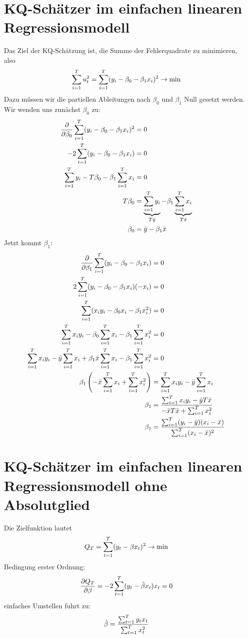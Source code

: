 \documentclass{article}
\begin{document}
	\section{KQ-Schätzer im einfachen linearen Regressionsmodell}
	Das Ziel der KQ-Schätzung ist, die Summe der Fehlerquadrate zu minimieren, also
	\begin{align}
		\sum_{i=1}^T u_t^2 = \sum_{i=1}^T (y_i-\beta_0 - \beta_1x_i)^2 \to\min \notag
	\end{align}
	Dazu müssen wir die partiellen Ableitungen nach $\beta_0$ und $\beta_1$ Null gesetzt werden. Wir wenden uns zunächst $\beta_0$ zu:
	\begin{align}
		\frac{\partial}{\partial\beta_0} \sum_{i=1}^T (y_i-\beta_0-\beta_1x_i)^2 &= 0 \notag \\
		-2\sum_{i=1}^T (y_i-\beta_0-\beta_1x_i) &= 0 \notag \\
		\sum_{i=1}^T y_i - T\beta_0 - \beta_1\sum_{i=1}^T x_i &= 0 \notag \\
		T\beta_0 &= \underbrace{\sum_{i=1}^T y_i}_{T\bar{y}} - \beta_1\underbrace{\sum_{i=1}^T x_i}_{T\bar{x}} \notag \\
		\beta_0 &= \bar{y} - \beta_1\bar{x} \notag
	\end{align}
	Jetzt kommt $\beta_1$:
	\begin{align}
		\frac{\partial}{\partial\beta_1} \sum_{i=1}^T(y_i-\beta_0-\beta_1x_i) &= 0 \notag \\
		2\sum_{i=1}^T (y_i-\beta_0-\beta_1x_i)(-x_i) &= 0 \notag \\
		\sum_{i=1}^T (x_iy_i - \beta_0x_i - \beta_1x_i^2) &= 0 \notag \\
		\sum_{i=1}^T x_iy_i - \beta_0\sum_{i=1}^T x_i - \beta_1\sum_{i=1}^T x_i^2 &= 0 \notag \\
		\sum_{i=1}^T x_iy_i - \bar{y}\sum_{i=1}^T x_i + \beta_1\bar{x}\sum_{i=1}^T x_i - \beta_1\sum_{i=1}^T x_i^2 &= 0 \notag \\
		\beta_1\left(-\bar{x}\sum_{i=1}^T x_i + \sum_{i=1}^T x_i^2\right) &= \sum_{i=1}^T x_iy_i - \bar{y}\sum_{i=1}^T x_i \notag \\
		\beta_1 &= \frac{\sum_{i=1}^T x_iy_i - \bar{y}T\bar{x}}{-\bar{x}T\bar{x} + \sum_{i=1}^T x_i^2} \notag \\
		\beta_1 &= \frac{\sum_{i=1}^T (y_i-\bar{y})(x_i-\bar{x})}{\sum_{i=1}^T (x_i-\bar{x})^2} \notag
	\end{align}

	\section{KQ-Schätzer im einfachen linearen Regressionsmodell ohne Absolutglied}
	Die Zielfunktion lautet
	\begin{align}
		Q_T = \sum_{t=1}^T (y_t-\beta x_t)^2 \to\min \notag
	\end{align}
	Bedingung erster Ordnung:
	\begin{align}
		\frac{\partial Q_T}{\partial \beta} = -2\sum_{t=1}^T (y_t-\hat{\beta}x_t)x_t = 0 \notag
	\end{align}
	einfaches Umstellen fuhrt zu:
	\begin{align}
		\hat{\beta} = \frac{\sum_{t=1}^T y_tx_t}{\sum_{t=1}^T x_t^2} \notag
	\end{align}
\end{document}
